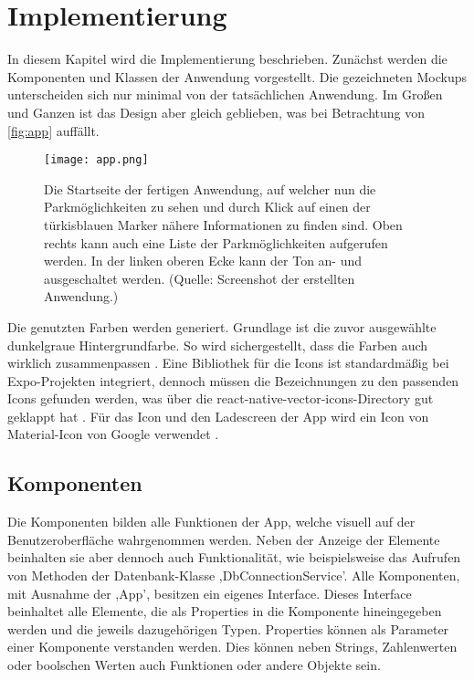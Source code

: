 \chapter{Implementierung}
\label{implementierung}
\renewcommand{\arraystretch}{1.2}

In diesem Kapitel wird die Implementierung beschrieben. Zunächst werden die Komponenten und Klassen der Anwendung vorgestellt. Die gezeichneten Mockups unterscheiden sich nur minimal von der tatsächlichen Anwendung. Im Großen und Ganzen ist das Design aber gleich geblieben, was bei Betrachtung von \autoref{fig:app} auffällt.

\begin{figure}[h!]
	\centering
	\texttt{[image: app.png]}
	\caption[Die Startseite der fertigen Anwendung, auf welcher nun die Parkmöglichkeiten zu sehen und durch Klick auf einen der türkisblauen Marker nähere Informationen zu finden sind. Oben rechts kann auch eine Liste der Parkmöglichkeiten aufgerufen werden. In der linken oberen Ecke kann der Ton an- und ausgeschaltet werden.]
	{Die Startseite der fertigen Anwendung, auf welcher nun die Parkmöglichkeiten zu sehen und durch Klick auf einen der türkisblauen Marker nähere Informationen zu finden sind. Oben rechts kann auch eine Liste der Parkmöglichkeiten aufgerufen werden. In der linken oberen Ecke kann der Ton an- und ausgeschaltet werden. (Quelle: Screenshot der erstellten Anwendung.)}
	\label{fig:app}
\end{figure}
\newpage

Die genutzten Farben werden generiert. Grundlage ist die zuvor ausgewählte dunkelgraue Hintergrundfarbe. So wird sichergestellt, dass die Farben auch wirklich zusammenpassen \cite{colors}. Eine Bibliothek für die Icons ist standardmäßig bei Expo-Projekten integriert, dennoch müssen die Bezeichnungen zu den passenden Icons gefunden werden, was über die react-native-vector-icons-Directory gut geklappt hat \cite{icons}. Für das Icon und den Ladescreen der App wird ein Icon von Material-Icon von Google verwendet \cite{locationIcon}.

\section{Komponenten}
Die Komponenten bilden alle Funktionen der App, welche visuell auf der Benutzeroberfläche wahrgenommen werden. Neben der Anzeige der Elemente beinhalten sie aber dennoch auch Funktionalität, wie beispielsweise das Aufrufen von Methoden der Datenbank-Klasse ,DbConnectionService'. Alle Komponenten, mit Ausnahme der ,App', besitzen ein eigenes Interface. Dieses Interface beinhaltet alle Elemente, die als Properties in die Komponente hineingegeben werden und die jeweils dazugehörigen Typen. Properties können als Parameter einer Komponente verstanden werden. Dies können neben Strings, Zahlenwerten oder boolschen Werten auch Funktionen oder andere Objekte sein.
